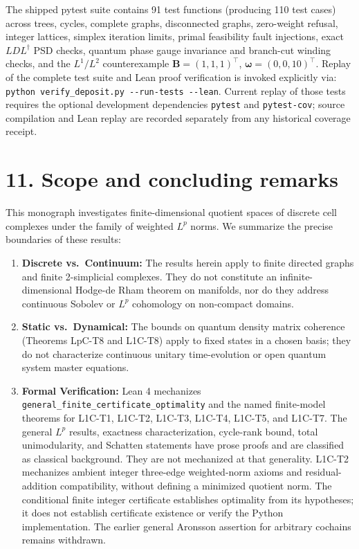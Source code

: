 \documentclass[
]{article}
\providecommand{\tightlist}{%
  \setlength{\itemsep}{0pt}\setlength{\parskip}{0pt}}
\providecommand{\tightlist}{%
  \setlength{\itemsep}{0pt}\setlength{\parskip}{0pt}}
\begin{document}
The shipped pytest suite contains 91 test functions (producing 110 test cases) across trees, cycles,
complete graphs, disconnected graphs, zero-weight refusal, integer lattices,
simplex iteration limits, primal feasibility fault injections, exact
\(LDL^\dagger\) PSD checks, quantum phase gauge invariance and branch-cut winding checks, and the \(L^1/L^2\) counterexample
\(\mathbf{B} = (1,1,1)^\top\), \(\boldsymbol{\omega} = (0,0,10)^\top\).
Replay of the complete test suite and Lean proof verification is invoked explicitly via:
\texttt{python\ verify\_deposit.py\ -\/-run-tests\ -\/-lean}.
Current replay of those tests requires the optional development dependencies
\texttt{pytest} and \texttt{pytest-cov}; source compilation and Lean replay are recorded
separately from any historical coverage receipt.

\section{11. Scope and concluding remarks}\label{scope-and-concluding-remarks}

This monograph investigates finite-dimensional quotient spaces of discrete cell complexes under the family of weighted \(L^p\) norms. We summarize the precise boundaries of these results:

\begin{enumerate}
\def\labelenumi{\arabic{enumi}.}
\tightlist
\item
  \textbf{Discrete vs.~Continuum:} The results herein apply to finite directed graphs and finite 2-simplicial complexes. They do not constitute an infinite-dimensional Hodge-de Rham theorem on manifolds, nor do they address continuous Sobolev or \(L^p\) cohomology on non-compact domains.
\item
  \textbf{Static vs.~Dynamical:} The bounds on quantum density matrix coherence (Theorems LpC-T8 and L1C-T8) apply to fixed states in a chosen basis; they do not characterize continuous unitary time-evolution or open quantum system master equations.
\item
  \textbf{Formal Verification:} Lean 4 mechanizes \texttt{general\_finite\_certificate\_optimality} and the named finite-model theorems for L1C-T1, L1C-T2, L1C-T3, L1C-T4, L1C-T5, and L1C-T7. The general \(L^p\) results, exactness characterization, cycle-rank bound, total unimodularity, and Schatten statements have prose proofs and are classified as classical background. They are not mechanized at that generality. L1C-T2 mechanizes ambient integer three-edge weighted-norm axioms and residual-addition compatibility, without defining a minimized quotient norm. The conditional finite integer certificate establishes optimality from its hypotheses; it does not establish certificate existence or verify the Python implementation. The earlier general Aronsson assertion for arbitrary cochains remains withdrawn.
\end{enumerate}
\end{document}
